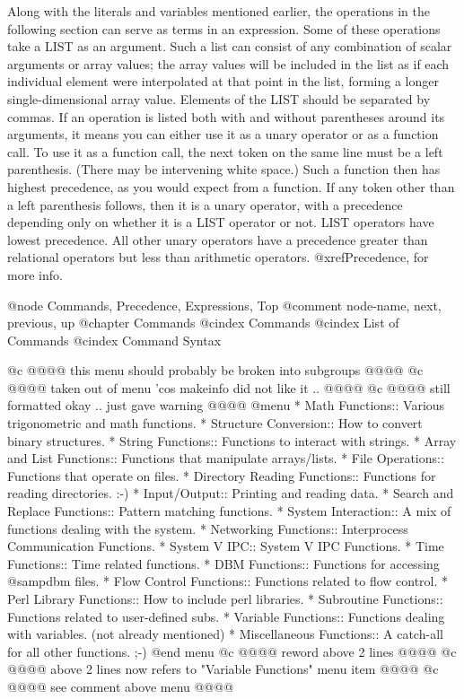 {{{{{{Along with the literals and variables mentioned earlier, the operations
in the following section can serve as terms in an expression.  Some of
these operations take a LIST as an argument.  Such a list can consist of
any combination of scalar arguments or array values; the array values
will be included in the list as if each individual element were
interpolated at that point in the list, forming a longer
single-dimensional array value.  Elements of the LIST should be
separated by commas.  If an operation is listed both with and without
parentheses around its arguments, it means you can either use it as a
unary operator or as a function call.  To use it as a function call, the
next token on the same line must be a left parenthesis.  (There may be
intervening white space.)  Such a function then has highest precedence,
as you would expect from a function.  If any token other than a left
parenthesis follows, then it is a unary operator, with a precedence
depending only on whether it is a LIST operator or not.  LIST operators
have lowest precedence.  All other unary operators have a precedence
greater than relational operators but less than arithmetic operators.
@xref{Precedence}, for more info.

@node     Commands, Precedence, Expressions, Top
@comment  node-name,  next,  previous,  up
@chapter Commands
@cindex Commands
@cindex List of Commands
@cindex Command Syntax

@c @@@@ this menu should probably be broken into subgroups @@@@
@c @@@@ taken out of menu 'cos makeinfo did not like it .. @@@@
@c @@@@ still formatted okay .. just gave warning @@@@
@menu
* Math Functions::                Various trigonometric and math functions.
* Structure Conversion::          How to convert binary structures.
* String Functions::              Functions to interact with strings.
* Array and List Functions::      Functions that manipulate arrays/lists.
* File Operations::               Functions that operate on files.
* Directory Reading Functions::   Functions for reading directories.  :-)
* Input/Output::                  Printing and reading data.
* Search and Replace Functions::  Pattern matching functions.
* System Interaction::            A mix of functions dealing with the system.
* Networking Functions::          Interprocess Communication Functions.
* System V IPC::                  System V IPC Functions.
* Time Functions::                Time related functions.
* DBM Functions::                 Functions for accessing @samp{dbm} files.
* Flow Control Functions::        Functions related to flow control.
* Perl Library Functions::        How to include perl libraries.
* Subroutine Functions::          Functions related to user-defined subs.
* Variable Functions::            Functions dealing with variables.
                                    (not already mentioned)
* Miscellaneous Functions::       A catch-all for all other functions.  ;-)
@end menu
@c @@@@ reword above 2 lines @@@@
@c @@@@ above 2 lines now refers to "Variable Functions" menu item @@@@
@c @@@@ see comment above menu @@@@

}}}}}}
